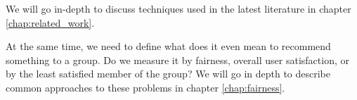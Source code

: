 We will go in-depth to discuss techniques used in the latest literature in chapter \ref{chap:related_work}.


At the same time, we need to define what does it even mean to recommend something to a group. Do we measure it by fairness, overall user satisfaction, or by the least satisfied member of the group? We will go in depth to describe common approaches to these problems in chapter \ref{chap:fairness}.

